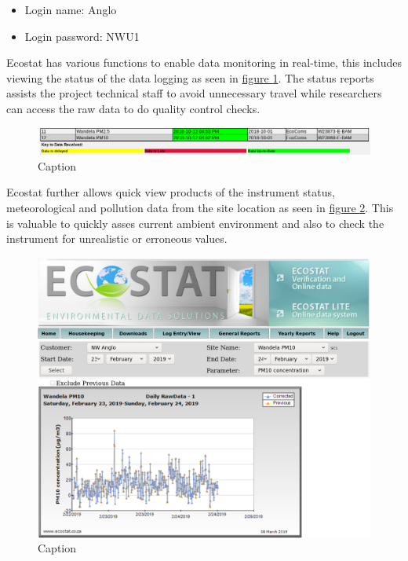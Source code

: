 \documentclass{nwureport}
\begin{document}
  
\begin{itemize}
\item Login name: Anglo
\item Login password: NWU1
\end{itemize}


Ecostat has various functions to enable data monitoring in real-time, this includes
viewing the status of the data logging as seen in \hyperref[fig:ecostat_status]{figure \ref{fig:ecostat_status}}. The status reports assists the project technical staff to avoid
unnecessary travel while researchers can access the raw data to do quality control checks. 

\begin{figure}[!htb]
    \centering
    \includegraphics[width=\textwidth]{images/ecstat_status.png}
    \caption[Ecostat.co.za status report]{Caption}
    \label{fig:ecostat_status}
\end{figure}

Ecostat further allows quick view products of the instrument status,
meteorological and pollution data from the site location as seen
in \hyperref[fig:ecostat_quick]{figure \ref{fig:ecostat_quick}}. This is
valuable to quickly asses current ambient environment and also to check the
instrument for unrealistic or erroneous values.

\begin{figure}[!htb]
    \centering
    \includegraphics[width=\textwidth]{images/ecostat_quick.png}
    \caption[Ecostat.co.za quick view]{Caption}
    \label{fig:ecostat_quick}
\end{figure}
\end{document}
